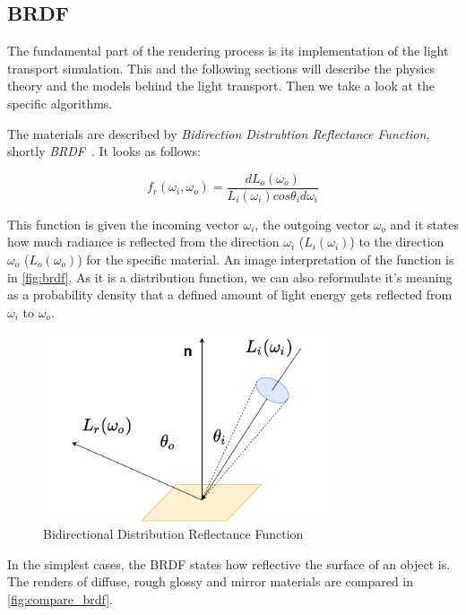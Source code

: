 \subsection{BRDF}
\label{sec:BRDF}

The fundamental part of the rendering process is its implementation of the light transport simulation. This and the following sections will describe the physics theory and the models behind the light transport. Then we take a look at the specific algorithms. 

The materials are described by \emph{Bidirection Distrubtion Reflectance Function}, shortly \emph{BRDF}~\cite{nicodemus1965directional}. It looks as follows:

\begin{equation} \label{eq:brdf}
f_r(\omega_i,\omega_o)=\frac{dL_o(\omega_o)}{L_i(\omega_i)cos\theta_i d\omega_i}
\end{equation}

This function is given the incoming vector $\omega_i$, the outgoing vector $\omega_o$ and it states how much radiance is reflected from the direction $\omega_i$ ($L_i(\omega_i)$) to the direction $\omega_o$ ($L_o(\omega_o)$) for the specific material.
An image interpretation of the function is in \autoref{fig:brdf}. As it is a distribution function, we can also reformulate it's meaning as a probability density that a defined amount of light energy gets reflected from $\omega_i$ to $\omega_o$.

\begin{figure}[h]
	\centering
	\includegraphics[width=85mm]{img/brdf.pdf}
	\caption{Bidirectional Distribution Reflectance Function}
	\label{fig:brdf}
\end{figure}

In the simplest cases, the BRDF states how reflective the surface of an object is. The renders of diffuse, rough glossy and mirror materials are compared in \autoref{fig:compare_brdf}.


